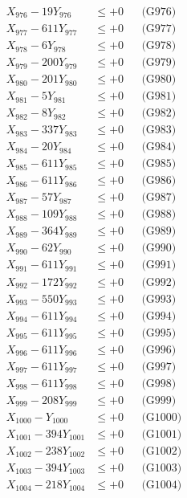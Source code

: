 \documentclass[a4paper,10pt]{article}
\begin{document}
{\begin{align}
X_{976} - 19Y_{976} &\leq +0 && \text{(G976)} \\
X_{977} - 611Y_{977} &\leq +0 && \text{(G977)} \\
X_{978} - 6Y_{978} &\leq +0 && \text{(G978)} \\
X_{979} - 200Y_{979} &\leq +0 && \text{(G979)} \\
X_{980} - 201Y_{980} &\leq +0 && \text{(G980)} \\
\allowbreak
X_{981} - 5Y_{981} &\leq +0 && \text{(G981)} \\
X_{982} - 8Y_{982} &\leq +0 && \text{(G982)} \\
X_{983} - 337Y_{983} &\leq +0 && \text{(G983)} \\
X_{984} - 20Y_{984} &\leq +0 && \text{(G984)} \\
X_{985} - 611Y_{985} &\leq +0 && \text{(G985)} \\
X_{986} - 611Y_{986} &\leq +0 && \text{(G986)} \\
X_{987} - 57Y_{987} &\leq +0 && \text{(G987)} \\
X_{988} - 109Y_{988} &\leq +0 && \text{(G988)} \\
X_{989} - 364Y_{989} &\leq +0 && \text{(G989)} \\
X_{990} - 62Y_{990} &\leq +0 && \text{(G990)} \\
\allowbreak
X_{991} - 611Y_{991} &\leq +0 && \text{(G991)} \\
X_{992} - 172Y_{992} &\leq +0 && \text{(G992)} \\
X_{993} - 550Y_{993} &\leq +0 && \text{(G993)} \\
X_{994} - 611Y_{994} &\leq +0 && \text{(G994)} \\
X_{995} - 611Y_{995} &\leq +0 && \text{(G995)} \\
X_{996} - 611Y_{996} &\leq +0 && \text{(G996)} \\
X_{997} - 611Y_{997} &\leq +0 && \text{(G997)} \\
X_{998} - 611Y_{998} &\leq +0 && \text{(G998)} \\
X_{999} - 208Y_{999} &\leq +0 && \text{(G999)} \\
X_{1000} - Y_{1000} &\leq +0 && \text{(G1000)} \\
\allowbreak
X_{1001} - 394Y_{1001} &\leq +0 && \text{(G1001)} \\
X_{1002} - 238Y_{1002} &\leq +0 && \text{(G1002)} \\
X_{1003} - 394Y_{1003} &\leq +0 && \text{(G1003)} \\
X_{1004} - 218Y_{1004} &\leq +0 && \text{(G1004)} \\

\end{align}}
\end{document}
